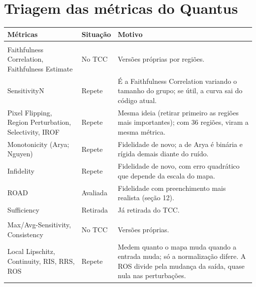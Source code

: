 \documentclass[11pt,a4paper]{article}
\begin{document}
\section{Triagem das métricas do Quantus}
\begin{center}\small
\begin{tabularx}{\linewidth}{>{\raggedright\arraybackslash}p{3.6cm}>{\raggedright\arraybackslash}p{2.2cm}X}
\toprule
\textbf{Métricas} & \textbf{Situação} & \textbf{Motivo} \\
\midrule
\multicolumn{3}{l}{\textit{Fidelidade}} \\
Faithfulness Correlation, Faithfulness Estimate & No TCC & Versões próprias por regiões. \\
SensitivityN & Repete & É a Faithfulness Correlation variando o tamanho do grupo; se útil, a curva sai do código atual. \\
Pixel Flipping, Region Perturbation, Selectivity, IROF & Repete & Mesma ideia (retirar primeiro as regiões mais importantes); com 36 regiões, viram a mesma métrica. \\
Monotonicity (Arya; Nguyen) & Repete & Fidelidade de novo; a de Arya é binária e rígida demais diante do ruído. \\
Infidelity & Repete & Fidelidade de novo, com erro quadrático que depende da escala do mapa. \\
ROAD & Avaliada & Fidelidade com preenchimento mais realista (seção 12). \\
Sufficiency & Retirada & Já retirada do TCC. \\
\addlinespace
\multicolumn{3}{l}{\textit{Robustez}} \\
Max/Avg-Sensitivity, Consistency & No TCC & Versões próprias. \\
Local Lipschitz, Continuity, RIS, RRS, ROS & Repete & Medem quanto o mapa muda quando a entrada muda; só a normalização difere. A ROS divide pela mudança da saída, quase nula nas perturbações. \\
\bottomrule
\end{tabularx}
\end{center}
\end{document}
